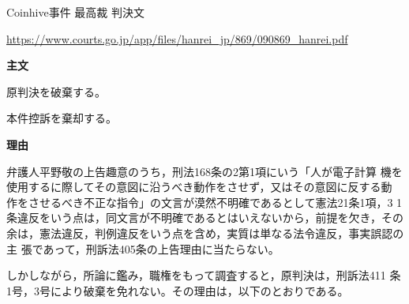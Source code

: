 \documentclass[12pt,a4paper]{ltjsarticle}
\begin{document}
Coinhive事件 最高裁 判決文

\url{https://www.courts.go.jp/app/files/hanrei_jp/869/090869_hanrei.pdf}

\hrulefill

\begin{center}
\end{center}

\begin{center}
 \textbf{\LARGE 主文}

 \begin{minipage}{130pt}
  原判決を破棄する。

  本件控訴を棄却する。
 \end{minipage}
\end{center}

\begin{center}
 \textbf{\LARGE 理由}
\end{center}


弁護人平野敬の上告趣意のうち，刑法168条の2第1項にいう「人が電子計算
機を使用するに際してその意図に沿うべき動作をさせず，又はその意図に反する動
作をさせるべき不正な指令」の文言が漠然不明確であるとして憲法21条1項，3
1条違反をいう点は，同文言が不明確であるとはいえないから，前提を欠き，その
余は，憲法違反，判例違反をいう点を含め，実質は単なる法令違反，事実誤認の主
張であって，刑訴法405条の上告理由に当たらない。

しかしながら，所論に鑑み，職権をもって調査すると，原判決は，刑訴法411
条1号，3号により破棄を免れない。その理由は，以下のとおりである。

\end{document}

